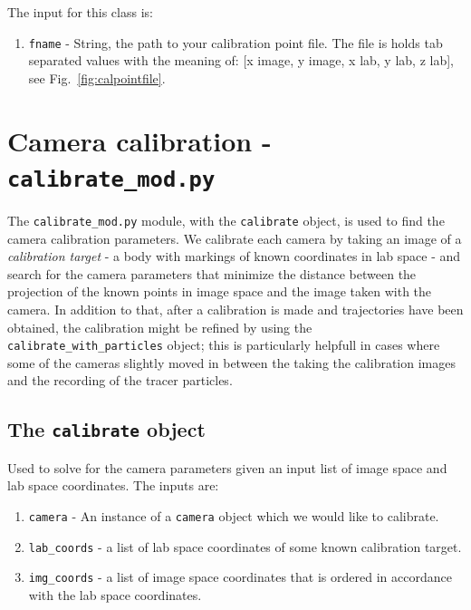 \documentclass[10pt,a4paper]{article}
\begin{document}
The input for this class is:
\begin{enumerate}
	\item \texttt{fname} - String, the path to your calibration point file. The file is holds tab separated values with the meaning of: [x image, y image, x lab, y lab, z lab], see Fig.~\ref{fig:calpointfile}.
\end{enumerate}








\section{Camera calibration - \texttt{calibrate\_mod.py}}


The \texttt{calibrate\_mod.py} module, with the \texttt{calibrate} object, is used to find the camera calibration parameters. We calibrate each camera by taking an image of a \textit{calibration target} - a body with markings of known coordinates in lab space - and search for the camera parameters that minimize the distance between the projection of the known points in image space and the image taken with the camera. In addition to that, after a calibration is made and trajectories have been obtained, the calibration might be refined by using the \texttt{calibrate\_with\_particles} object; this is particularly helpfull in cases where some of the cameras slightly moved in between the taking the calibration images and the recording of the tracer particles.



\subsection{The \texttt{calibrate} object}\label{sec:calibrate_obj}

Used to solve for the camera parameters given an input list of image space and lab space coordinates. The inputs are:

\begin{enumerate}
	\item \texttt{camera} - An instance of a \texttt{camera} object which we would like to calibrate.
	\item \texttt{lab\_coords} - a list of lab space coordinates of some known calibration target. 
	\item \texttt{img\_coords} - a list of image space coordinates that is ordered in accordance with the lab space coordinates. 
\end{enumerate}
\end{document}
